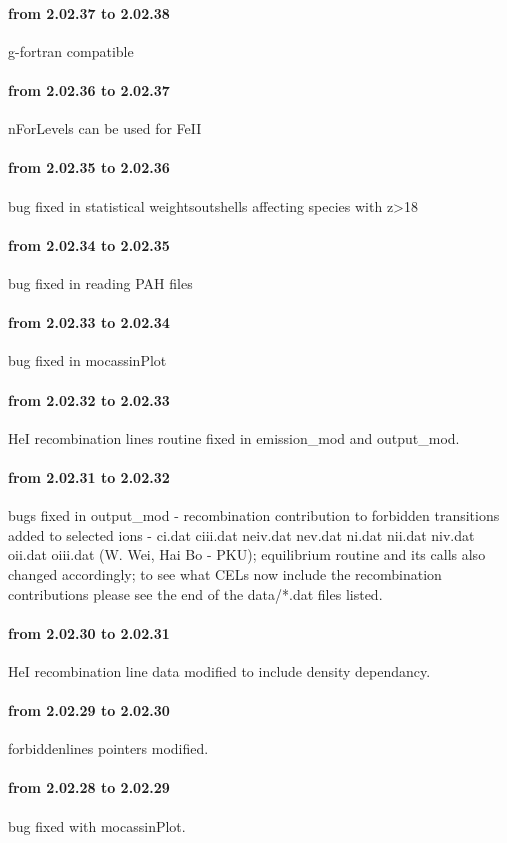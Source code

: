 \documentclass[11pt]{article}
\begin{document}
\paragraph{from 2.02.37 to 2.02.38} g-fortran compatible
\paragraph{from 2.02.36 to 2.02.37} nForLevels can be used for FeII 
\paragraph{from 2.02.35 to 2.02.36} bug fixed in statistical weightsoutshells affecting species with z>18
\paragraph{from 2.02.34 to 2.02.35} bug fixed in reading PAH files
\paragraph{from 2.02.33 to 2.02.34} bug fixed in mocassinPlot
\paragraph{from 2.02.32 to 2.02.33} HeI recombination lines routine fixed in emission\_mod and output\_mod.
\paragraph{from 2.02.31 to 2.02.32} bugs fixed in output\_mod - recombination contribution to forbidden transitions added to selected ions - ci.dat    ciii.dat  neiv.dat  nev.dat   ni.dat    nii.dat   niv.dat   oii.dat   oiii.dat (W. Wei, Hai Bo - PKU); equilibrium routine and its calls also changed accordingly; to see what CELs now include the recombination contributions please see the end of the data/*.dat files listed. 
\paragraph{from 2.02.30 to 2.02.31} HeI recombination line data modified to include density dependancy.
\paragraph{from 2.02.29 to 2.02.30} forbiddenlines pointers modified.
\paragraph{from 2.02.28 to 2.02.29} bug fixed with mocassinPlot.
\end{document}

